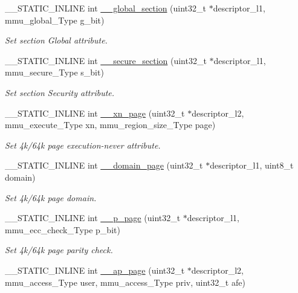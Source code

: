 \begin{DoxyCompactItemize}
\+\_\+\+\_\+\+S\+T\+A\+T\+I\+C\+\_\+\+I\+N\+L\+I\+NE int \hyperlink{group___m_m_u___functions_gab9ebaae8d22bfbff6ce2909c778ca43a}{\+\_\+\+\_\+global\+\_\+section} (uint32\+\_\+t $\ast$descriptor\+\_\+l1, mmu\+\_\+global\+\_\+\+Type g\+\_\+bit)
\begin{DoxyCompactList}\small\item\em Set section Global attribute. \end{DoxyCompactList}\item 
\+\_\+\+\_\+\+S\+T\+A\+T\+I\+C\+\_\+\+I\+N\+L\+I\+NE int \hyperlink{group___m_m_u___functions_gac1430230710ffbf0f3f279f118b0f8b3}{\+\_\+\+\_\+secure\+\_\+section} (uint32\+\_\+t $\ast$descriptor\+\_\+l1, mmu\+\_\+secure\+\_\+\+Type s\+\_\+bit)
\begin{DoxyCompactList}\small\item\em Set section Security attribute. \end{DoxyCompactList}\item 
\+\_\+\+\_\+\+S\+T\+A\+T\+I\+C\+\_\+\+I\+N\+L\+I\+NE int \hyperlink{group___m_m_u___functions_ga29333191c243fead911c3a25586583ef}{\+\_\+\+\_\+xn\+\_\+page} (uint32\+\_\+t $\ast$descriptor\+\_\+l2, mmu\+\_\+execute\+\_\+\+Type xn, mmu\+\_\+region\+\_\+size\+\_\+\+Type page)
\begin{DoxyCompactList}\small\item\em Set 4k/64k page execution-\/never attribute. \end{DoxyCompactList}\item 
\+\_\+\+\_\+\+S\+T\+A\+T\+I\+C\+\_\+\+I\+N\+L\+I\+NE int \hyperlink{group___m_m_u___functions_gaf6ade9af49080e011c6ac9ad46b4993f}{\+\_\+\+\_\+domain\+\_\+page} (uint32\+\_\+t $\ast$descriptor\+\_\+l1, uint8\+\_\+t domain)
\begin{DoxyCompactList}\small\item\em Set 4k/64k page domain. \end{DoxyCompactList}\item 
\+\_\+\+\_\+\+S\+T\+A\+T\+I\+C\+\_\+\+I\+N\+L\+I\+NE int \hyperlink{group___m_m_u___functions_gad99cf050a448feeb534988003e38b861}{\+\_\+\+\_\+p\+\_\+page} (uint32\+\_\+t $\ast$descriptor\+\_\+l1, mmu\+\_\+ecc\+\_\+check\+\_\+\+Type p\+\_\+bit)
\begin{DoxyCompactList}\small\item\em Set 4k/64k page parity check. \end{DoxyCompactList}\item 
\+\_\+\+\_\+\+S\+T\+A\+T\+I\+C\+\_\+\+I\+N\+L\+I\+NE int \hyperlink{group___m_m_u___functions_gaf87456022881530f30354c3e84955bf8}{\+\_\+\+\_\+ap\+\_\+page} (uint32\+\_\+t $\ast$descriptor\+\_\+l2, mmu\+\_\+access\+\_\+\+Type user, mmu\+\_\+access\+\_\+\+Type priv, uint32\+\_\+t afe)

\end{DoxyCompactItemize}
